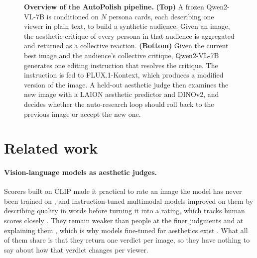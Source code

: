 \documentclass{article}
\begin{document}
\begin{figure}[t]
  \caption{\textbf{Overview of the AutoPolish pipeline.} \textbf{(Top)} A frozen Qwen2-VL-7B is conditioned on $N$ persona cards, each describing one viewer in plain text, to build a synthetic audience. Given an image, the aesthetic critique of every persona in that audience is aggregated and returned as a collective reaction. \textbf{(Bottom)} Given the current best image and the audience's collective critique, Qwen2-VL-7B generates one editing instruction that resolves the critique. The instruction is fed to FLUX.1-Kontext, which produces a modified version of the image. A held-out aesthetic judge then examines the new image with a LAION aesthetic predictor and DINOv2, and decides whether the auto-research loop should roll back to the previous image or accept the new one.}
  \label{fig:overview}
\end{figure}


\section{Related work}

\paragraph{Vision-language models as aesthetic judges.} Scorers built on CLIP made it practical to rate an image the model has never been trained on \citep{schuhmann2022, ke2023vila}, and instruction-tuned multimodal models improved on them by describing quality in words before turning it into a rating, which tracks human scores closely \citep{wu2024qbench, wu2024qalign}. They remain weaker than people at the finer judgments and at explaining them \citep{huang2024aesbench, zhou2024uniaa}, which is why models fine-tuned for aesthetics exist \citep{huang2024aesexpert}. What all of them share is that they return one verdict per image, so they have nothing to say about how that verdict changes per viewer.
\end{document}
